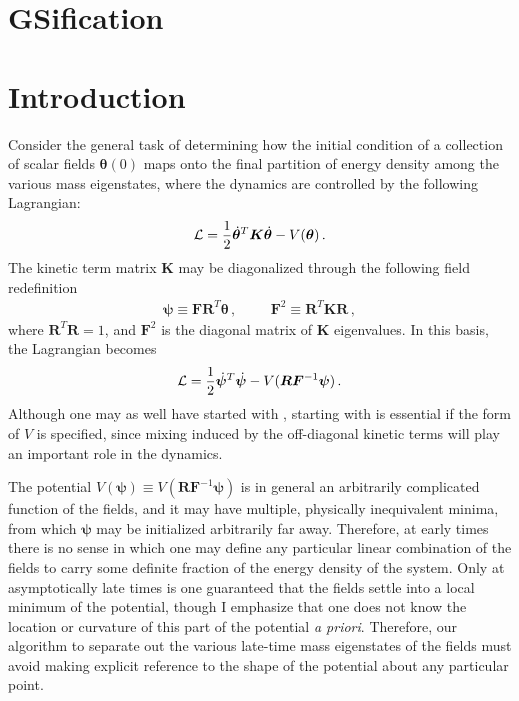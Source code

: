 \documentclass{article}
\begin{document}
\section{GSification}

\appendix
\section{Introduction}
Consider the general task of determining how the initial condition of a collection of scalar fields $\bm \theta(0)$ maps onto the final partition of energy density among the various mass eigenstates, where the dynamics are controlled by the following Lagrangian:
\begin{align}\label{eqn:fundamental}
    {\cal L} = \frac{1}{2}\dot{\bm \theta}^T {\bm K}\dot{\bm\theta} - V(\bm\theta)\,.
\end{align}
The kinetic term matrix $\bm K$ may be diagonalized through the following field redefinition
\begin{align}
    \bm\psi \equiv \bm F \bm R^T \bm\theta\,,\hspace{1cm}\bm F^2\equiv \bm R^T \bm K \bm R\,,
\end{align}
where $\bm R^T \bm R  = 1$, and $\bm F^2$ is the diagonal matrix of $\bm K$ eigenvalues. In this basis, the Lagrangian becomes
\begin{align}\label{eqn:canonical}
    {\cal L} = \frac12\dot{\bm\psi}^T\dot{\bm\psi} - V(\bm R\bm F^{-1}\bm\psi)\,.
\end{align}
Although one may as well have started with , starting with  is essential if the form of $V$ is specified, since mixing induced by the off-diagonal kinetic terms will play an important role in the dynamics.

The potential $V(\bm\psi)\equiv V(\bm R\bm F^{-1}\bm\psi)$ is in general an arbitrarily complicated function of the fields, and it may have multiple, physically inequivalent minima, from which $\bm\psi$ may be initialized arbitrarily far away. Therefore, at early times there is no sense in which one may define any particular linear combination of the fields to carry some definite fraction of the energy density of the system. Only at asymptotically late times is one guaranteed that the fields settle into a local minimum of the potential, though I emphasize that one does not know the location or curvature of this part of the potential \emph{a priori}. Therefore, our algorithm to separate out the various late-time mass eigenstates of the fields must avoid making explicit reference to the shape of the potential about any particular point.
\end{document}
